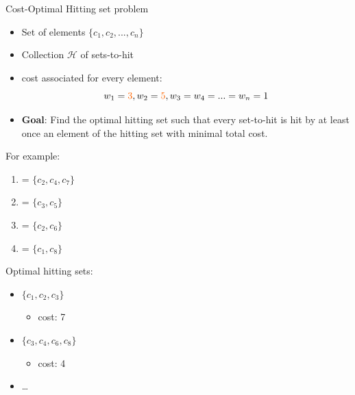 \documentclass{beamer}
\newcommand\m[1]{\ensuremath{\mathcal{#1}}\xspace}
\newcommand\formula{\ensuremath{\m{F} }\xspace}
\renewcommand\emph[1]{{\color{vuborange}#1}}
\newcommand\subsetT{\m{\mathcal{S}}}
\begin{document}
			\begin{frame}{\emph{Cost-Optimal} Hitting set problem}
				\begin{itemize}
					\item Set of elements $\{c_1,c_2,...,c_n\}$
					\item Collection $\m{H}$ of sets-to-hit\pause
					\item cost associated for every element:
					\[ w_1 =  \emph{3}, w_2= \emph{5}, w_3 = w_4 = ...= w_n = 1\]\pause
					\item \textbf{Goal}: Find the \emph{optimal} hitting set such that every set-to-hit is hit by at least once an element of the hitting set with \emph{minimal total cost}.
				\end{itemize}
				\vfill
				\begin{minipage}{0.48\textwidth}
					For example: 
					\begin{enumerate}
						\item[$H_1$] = $\{c_2, c_4, c_7\}$
						\item[$H_2$] = $\{c_3, c_5\}$
						\item[$H_3$] = $\{c_2, c_6\}$
						\item[$H_4$] = $\{c_1, c_8\}$
					\end{enumerate}
				\end{minipage}
				\begin{minipage}{0.48\textwidth}
					Optimal hitting sets:
					\begin{itemize}
						\item \st{$\{c_1, c_2, c_3\}$}
						\begin{itemize}
							\item cost: \emph{7}
						\end{itemize}
						\item $\{c_3, c_4, c_6, c_8\}$ \emph{\checkmark}
						\begin{itemize}
							\item cost: \emph{4}
						\end{itemize}
						\item \dots
					\end{itemize}
				\end{minipage}
			\end{frame}
			
			
			
\end{document}

